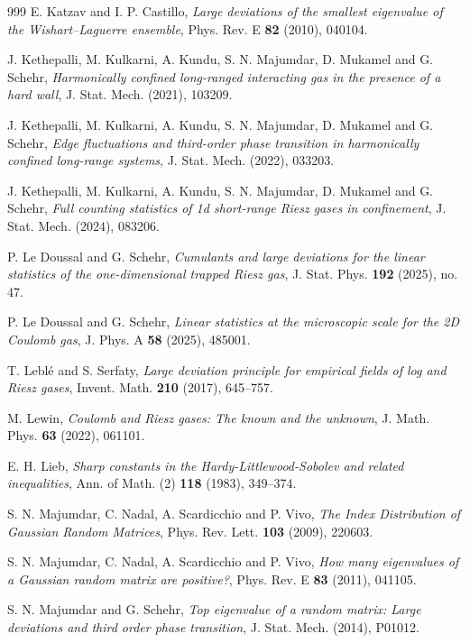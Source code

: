 \documentclass{amsart}
\theoremstyle{plain}
\theoremstyle{remark}
\numberwithin{equation}{section}
\begin{document}
\begin{thebibliography}{999}
 E. Katzav and I. P. Castillo, \emph{Large deviations of the smallest eigenvalue of the Wishart–Laguerre ensemble}, Phys. Rev. E \textbf{82} (2010), 040104.

 J. Kethepalli, M. Kulkarni, A. Kundu, S. N. Majumdar, D. Mukamel and G. Schehr, \emph{Harmonically confined long-ranged interacting gas in the presence of a hard wall}, J. Stat. Mech. (2021), 103209.

 J. Kethepalli, M. Kulkarni, A. Kundu, S. N. Majumdar, D. Mukamel and G. Schehr, \emph{Edge fluctuations and third-order phase transition in harmonically confined long-range systems}, J. Stat. Mech. (2022), 033203.

 J. Kethepalli, M. Kulkarni, A. Kundu, S. N. Majumdar, D. Mukamel and G. Schehr, \emph{Full counting statistics of 1d short-range Riesz gases in confinement}, J. Stat. Mech. (2024), 083206. 


 P. Le Doussal and G. Schehr, \emph{Cumulants and large deviations for the linear statistics of the one-dimensional trapped Riesz gas}, J. Stat. Phys. \textbf{192} (2025), no. 47.

 P. Le Doussal and G. Schehr, \emph{Linear statistics at the microscopic scale for the 2D Coulomb gas}, J. Phys. A \textbf{58} (2025), 485001.

 T. Leblé and S. Serfaty, \emph{Large deviation principle for empirical fields of log and Riesz gases}, Invent. Math. \textbf{210} (2017), 645--757.



 M. Lewin, {\it Coulomb and Riesz gases: The known and the unknown}, J. Math. Phys. {\bf 63}  (2022), 061101.


 E. H. Lieb, \emph{Sharp constants in the Hardy-Littlewood-Sobolev and related inequalities}, Ann. of Math. (2) \textbf{118} (1983), 349--374.


 S. N. Majumdar, C. Nadal, A. Scardicchio and P. Vivo, {\it The Index Distribution of Gaussian Random Matrices}, Phys. Rev. Lett. \textbf{103} (2009), 220603.


 S. N. Majumdar, C. Nadal, A. Scardicchio and P. Vivo, \emph{How many eigenvalues of a Gaussian random matrix are positive?}, Phys. Rev. E \textbf{83} (2011), 041105. 

 S. N. Majumdar and G. Schehr, \emph{Top eigenvalue of a random matrix: Large deviations and third order phase transition}, J. Stat. Mech. (2014), P01012.


\end{thebibliography}
\end{document}
